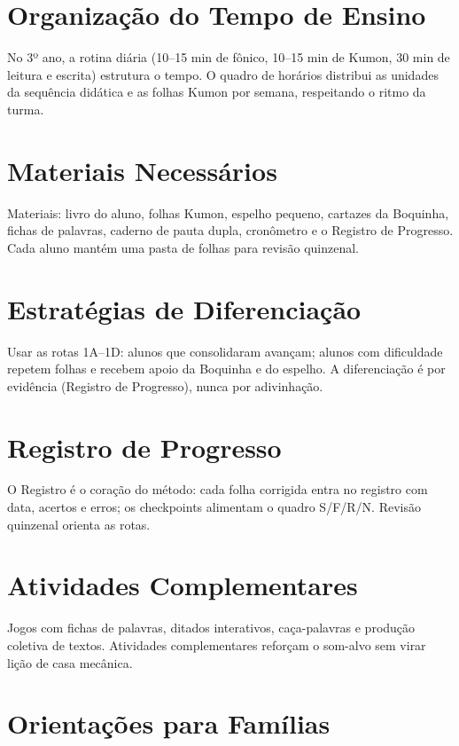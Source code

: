 
\chapter{Organização do Tempo de Ensino}

No 3º ano, a rotina diária (10–15 min de fônico, 10–15 min de Kumon, 30 min de leitura e escrita) estrutura o tempo. O quadro de horários distribui as unidades da sequência didática e as folhas Kumon por semana, respeitando o ritmo da turma.


\chapter{Materiais Necessários}

Materiais: livro do aluno, folhas Kumon, espelho pequeno, cartazes da Boquinha, fichas de palavras, caderno de pauta dupla, cronômetro e o Registro de Progresso. Cada aluno mantém uma pasta de folhas para revisão quinzenal.


\chapter{Estratégias de Diferenciação}

Usar as rotas 1A–1D: alunos que consolidaram avançam; alunos com dificuldade repetem folhas e recebem apoio da Boquinha e do espelho. A diferenciação é por evidência (Registro de Progresso), nunca por adivinhação.


\chapter{Registro de Progresso}

O Registro é o coração do método: cada folha corrigida entra no registro com data, acertos e erros; os checkpoints alimentam o quadro S/F/R/N. Revisão quinzenal orienta as rotas.


\chapter{Atividades Complementares}

Jogos com fichas de palavras, ditados interativos, caça-palavras e produção coletiva de textos. Atividades complementares reforçam o som-alvo sem virar lição de casa mecânica.


\chapter{Orientações para Famílias}

